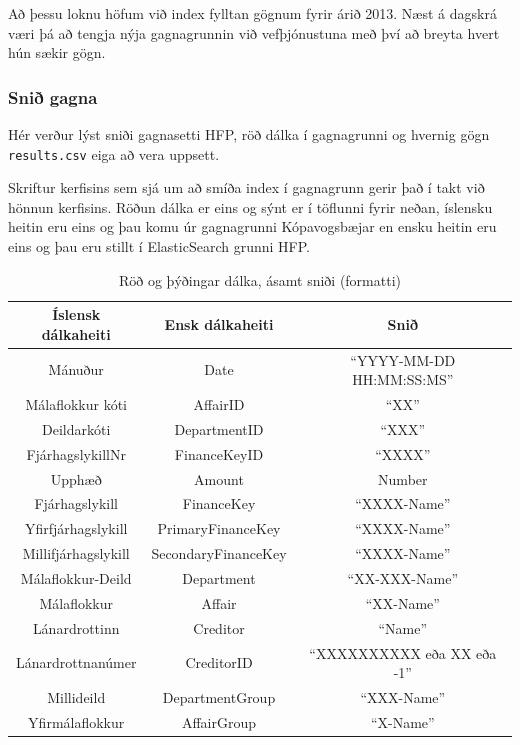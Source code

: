 \documentclass{article}
\theoremstyle{blueP}
\theoremstyle{greenS}
\begin{document}
\noindent Að þessu loknu höfum við index fylltan gögnum fyrir árið 2013. Næst á dagskrá væri þá að tengja nýja gagnagrunnin við vefþjónustuna með því að breyta hvert hún sækir gögn.

\subsubsection{Snið gagna}
\label{chapter:dataformat}
Hér verður lýst sniði gagnasetti HFP, röð dálka í gagnagrunni og hvernig gögn \lstinline{results.csv} eiga að vera uppsett.

Skriftur kerfisins sem sjá um að smíða index í gagnagrunn gerir það í takt við hönnun kerfisins. Röðun dálka er eins og sýnt er í töflunni fyrir neðan, íslensku heitin eru eins og þau komu úr gagnagrunni Kópavogsbæjar en ensku heitin eru eins og þau eru stillt í ElasticSearch grunni HFP.

\begin{table}[H]
    \centering
    \begin{tabular}{|c|c|c|}
        \hline
        \textbf{Íslensk dálkaheiti} & \textbf{Ensk dálkaheiti} & \textbf{Snið}
        \\ \hline
        Mánuður & Date & ``YYYY-MM-DD HH:MM:SS:MS''
        \\ \hline
        Málaflokkur kóti & AffairID & ``XX''
        \\ \hline
        Deildarkóti & DepartmentID & ``XXX''
        \\ \hline
        FjárhagslykillNr & FinanceKeyID & ``XXXX''
        \\ \hline
        Upphæð & Amount & Number
        \\ \hline
        Fjárhagslykill & FinanceKey & ``XXXX-Name''
        \\ \hline
        Yfirfjárhagslykill & PrimaryFinanceKey & ``XXXX-Name''
        \\ \hline
        Millifjárhagslykill & SecondaryFinanceKey & ``XXXX-Name''
        \\ \hline
        Málaflokkur-Deild & Department & ``XX-XXX-Name''
        \\ \hline
        Málaflokkur & Affair & ``XX-Name''
        \\ \hline
        Lánardrottinn & Creditor & ``Name''
        \\ \hline
        Lánardrottnanúmer & CreditorID & ``XXXXXXXXXX eða XX eða -1''
        \\ \hline
        Millideild & DepartmentGroup & ``XXX-Name''
        \\ \hline
        Yfirmálaflokkur & AffairGroup & ``X-Name''
        \\ \hline
    \end{tabular}
    \label{table:translation_col}
    \caption{Röð og þýðingar dálka, ásamt sniði (formatti)}
\end{table}
\end{document}
